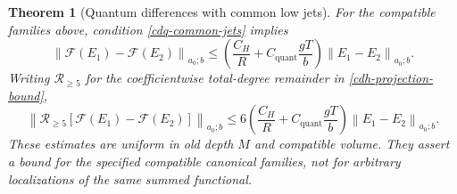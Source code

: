 \documentclass[11pt]{article}
\newtheorem{theorem}{Theorem}[section]
\theoremstyle{remark}
\newcommand{\norm}[1]{\left\|#1\right\|}
\begin{document}
\begin{theorem}[Quantum differences with common low jets]
\label{cdq-theorem}
For the compatible families above, condition
\eqref{cdq-common-jets} implies
\begin{equation}
 \norm{\mathscr F(E_1)-\mathscr F(E_2)}_{a_0;b}
 \le
 \left(\frac{C_H}{R}
             +C_{\mathrm{quant}}\frac{gT}{b}\right)
                       \norm{E_1-E_2}_{a_0;b}.
 \label{cdq-full-bound}
\end{equation}
Writing $\mathcal R_{\ge5}$ for the coefficientwise
total-degree remainder in \eqref{cdh-projection-bound},
\begin{equation}
 \norm{\mathcal R_{\ge5}
       [\mathscr F(E_1)-\mathscr F(E_2)]}_{a_0;b}
 \le6\left(\frac{C_H}{R}
             +C_{\mathrm{quant}}\frac{gT}{b}\right)
                       \norm{E_1-E_2}_{a_0;b}.
 \label{cdq-projected-bound}
\end{equation}
These estimates are uniform in old depth $M$ and compatible
volume. They assert a bound for the specified compatible
canonical families, not for arbitrary localizations of
the same summed functional.
\end{theorem}
\end{document}
